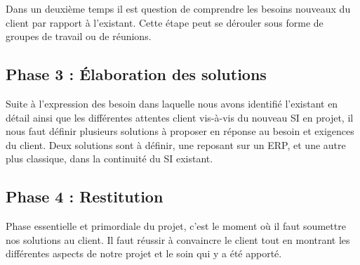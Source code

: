 Dans un deuxième temps il est question de comprendre les besoins nouveaux du client par rapport à l’existant. Cette étape peut se dérouler sous forme de groupes de travail ou de réunions.

\subsection{Phase 3 : Élaboration des solutions}

Suite à l’expression des besoin dans laquelle nous avons identifié l’existant en détail ainsi que les différentes attentes client vis-à-vis du nouveau SI en projet, il nous faut définir plusieurs solutions à proposer en réponse au besoin et exigences du client. Deux solutions sont à définir, une reposant sur un ERP, et une autre plus classique, dans la continuité du SI existant.

\subsection{Phase 4 : Restitution}

Phase essentielle et primordiale du projet, c’est le moment où il faut soumettre nos solutions au client. Il faut réussir à convaincre le client tout en montrant les différentes aspects de notre projet et le soin qui y a été apporté.
